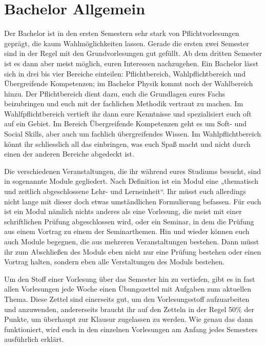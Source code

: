 \section{Bachelor Allgemein}
Der Bachelor ist in den ersten Semestern sehr stark von Pflichtvorlesungen
geprägt, die kaum Wahlmöglichkeiten lassen. Gerade die ersten zwei Semester
sind in der Regel mit den Grundvorlesungen gut gefüllt. Ab dem dritten Semester
ist es dann aber meist möglich, euren Interessen nachzugehen. 
Ein Bachelor lässt sich in drei bis vier Bereiche einteilen: Pflichtbereich,
Wahlpflichtbereich und Übergreifende Kompetenzen; im Bachelor Physik kommt noch
der Wahlbereich hinzu.
Der Pflichtbereich dient dazu, euch die Grundlagen eures Fachs beizubringen und
euch mit der fachlichen Methodik vertraut zu machen.  Im Wahlfpflichtbereich
vertieft ihr dann eure Kenntnisse und spezialisiert euch oft auf ein Gebiet. Im
Bereich Übergreifende Kompetenzen geht es um Soft- und Social Skills, aber auch
um fachlich übergreifendes Wissen.  Im Wahlpflichtbereich könnt ihr
schliesslich all das einbringen, was euch Spaß macht und nicht durch einen der
anderen Bereiche abgedeckt ist.

Die verschiedenen Veranstaltungen, die ihr während eures Studiums besucht, sind in sogenannte Module gegliedert. Nach Definition ist ein Modul eine „thematisch und zeitlich abgeschlossene Lehr- und Lerneinheit“. Ihr müsst euch allerdings nicht lange mit dieser doch etwas umständlichen Formulierung befassen. Für euch ist ein Modul nämlich nichts anderes als eine Vorlesung, die meist mit einer schriftlichen Prüfung abgeschlossen wird, oder ein Seminar, in dem die Prüfung aus einem Vortrag zu einem der Seminarthemen. Hin und wieder können euch auch Module begegnen, die aus mehreren Veranstaltungen bestehen. Dann müsst ihr zum Abschließen des Moduls eben nicht nur eine Prüfung bestehen oder einen Vortrag halten, sondern eben alle Verstaltungen des Moduls bestehen. 

Um den Stoff einer Vorlesung über das Semester hin zu vertiefen, gibt es in fast allen Vorlesungen jede Woche einen Übungszettel mit Aufgaben zum aktuellen Thema. Diese Zettel sind einerseits gut, um den Vorlesungsstoff aufzuarbeiten und anzuwenden, andererseits braucht ihr auf den Zetteln in der Regel 50\% der Punkte, um überhaupt zur Klausur zugelassen zu werden. Wie genau das dann funktioniert, wird euch in den einzelnen Vorlesungen am Anfang jedes Semesters ausführlich erklärt. 

